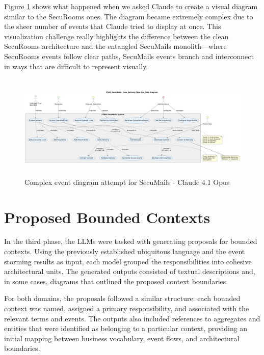   Figure \ref{fig:diagram-event-storming-claude-1} shows what happened when we asked Claude to create a visual diagram similar to the SecuRooms ones. The diagram became extremely complex due to the sheer number of events that Claude tried to display at once. This visualization challenge really highlights the difference between the clean SecuRooms architecture and the entangled SecuMails monolith—where SecuRooms events follow clear paths, SecuMails events branch and interconnect in ways that are difficult to represent visually.
  
  \begin{figure}[htbp]
    \centering
    \includegraphics[height=5cm]{figures/diagram-secumail-event-1.png} 
    \caption{Complex event diagram attempt for SecuMails - Claude 4.1 Opus}
    \label{fig:diagram-event-storming-claude-1} 
  \end{figure}

\section{Proposed Bounded Contexts}

In the third phase, the LLMs were tasked with generating proposals for bounded contexts. Using the previously established ubiquitous language and the event storming results as input, each model grouped the responsibilities into cohesive architectural units. The generated outputs consisted of textual descriptions and, in some cases, diagrams that outlined the proposed context boundaries.

For both domains, the proposals followed a similar structure: each bounded context was named, assigned a primary responsibility, and associated with the relevant terms and events. The outputs also included references to aggregates and entities that were identified as belonging to a particular context, providing an initial mapping between business vocabulary, event flows, and architectural boundaries.

